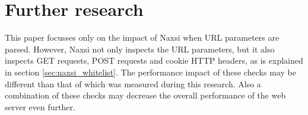 \documentclass[Further research]{subfiles}
\begin{document}
\section{Further research}
\label{sec:Further research}

This paper focusses only on the impact of Naxsi when \ac{URL} parameters are parsed. However, Naxsi not only inspects the \ac{URL} parameters, but it also inspects GET requests, POST requests and cookie HTTP headers, as is explained in section \ref{sec:naxsi_whitelist}. The performance impact of these checks may be different than that of which was measured during this research. Also a combination of these checks may decrease the overall performance of the web server even further.
\end{document}
